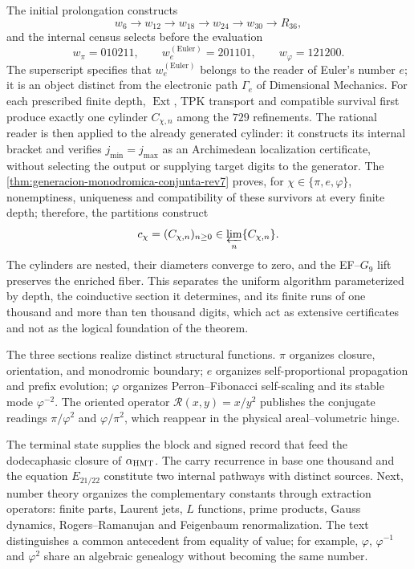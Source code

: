 The initial prolongation constructs
\[
 w_6\longrightarrow w_{12}\longrightarrow w_{18}
 \longrightarrow w_{24}\longrightarrow w_{30}
 \longrightarrow R_{36},
\]
and the internal census selects before the evaluation
\[
 w_\pi=010211,\qquad w_e^{(\mathrm{Euler})}=201101,\qquad
 w_\varphi=121200.
\]
The superscript specifies that \(w_e^{(\mathrm{Euler})}\) belongs to the reader of
Euler's number \(e\); it is an object distinct from the electronic path
\(\Gamma_e\) of Dimensional Mechanics.
For each prescribed finite depth, \(\operatorname{Ext}\), TPK
transport and compatible survival first produce exactly one
cylinder \(C_{\chi,n}\) among the \(729\) refinements. The rational reader
is then applied to the already generated cylinder: it constructs its internal bracket and
verifies \(j_{\min}=j_{\max}\) as an Archimedean localization certificate,
without selecting the output or supplying target digits to the generator. The
\cref{thm:generacion-monodromica-conjunta-rev7} proves, for
\(\chi\in\{\pi,e,\varphi\}\), nonemptiness, uniqueness and
compatibility of these survivors at every finite depth; therefore,
the partitions construct
\[
 c_\chi=(C_{\chi,n})_{n\ge0}
 \in\varprojlim_n\{C_{\chi,n}\}.
\]
The cylinders are nested, their diameters converge to zero, and the
EF--\(G_9\) lift preserves the enriched fiber. This separates
the uniform algorithm parameterized by depth, the coinductive section it
determines, and its finite runs of one thousand and more than ten
thousand digits, which act as extensive certificates and not as the logical
foundation of the theorem.

The three sections realize distinct structural functions. \(\pi\)
organizes closure, orientation, and monodromic boundary; \(e\) organizes
self-proportional propagation and prefix evolution; \(\varphi\) organizes
Perron--Fibonacci self-scaling and its stable mode \(\varphi^{-2}\). The
oriented operator \(\mathscr R(x,y)=x/y^2\) publishes the conjugate readings
\(\pi/\varphi^2\) and \(\varphi/\pi^2\), which reappear in the physical
areal--volumetric hinge.

The terminal state supplies the block and signed record that feed
the dodecaphasic closure of \(\alpha_{\rm HMT}\). The carry recurrence in
base one thousand and the equation \(E_{21/22}\) constitute two internal pathways with
distinct sources. Next, number theory organizes the
complementary constants through extraction operators: finite parts,
Laurent jets, \(L\) functions, prime products, Gauss dynamics,
Rogers--Ramanujan and Feigenbaum renormalization. The text distinguishes
a common antecedent from equality of value; for example, \(\varphi\),
\(\varphi^{-1}\) and \(\varphi^2\) share an algebraic genealogy without
becoming the same number.


